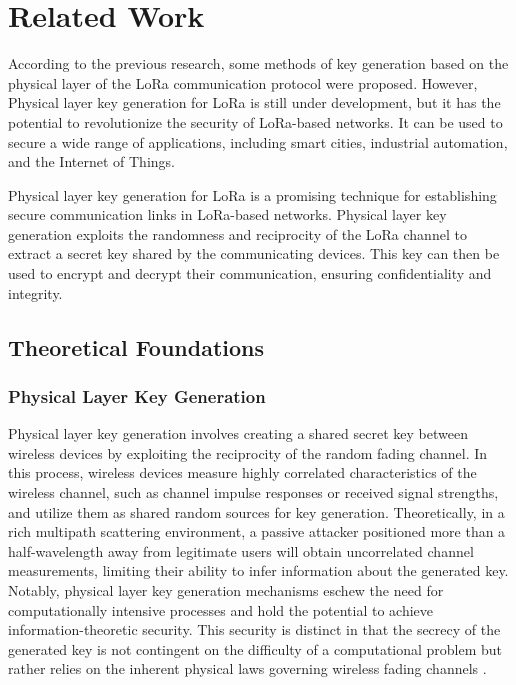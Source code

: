 
\chapter{Related Work}
According to the previous research, some methods of key generation based on the physical layer of the LoRa communication protocol were proposed. However, Physical layer key generation for LoRa is still under development, but it has the potential to revolutionize the security of LoRa-based networks. It can be used to secure a wide range of applications, including smart cities, industrial automation, and the Internet of Things.

Physical layer key generation for LoRa is a promising technique for establishing secure communication links in LoRa-based networks. Physical layer key generation exploits the randomness and reciprocity of the LoRa channel to extract a secret key shared by the communicating devices. This key can then be used to encrypt and decrypt their communication, ensuring confidentiality and integrity.

\section{Theoretical Foundations}

\subsection{Physical Layer Key Generation}
Physical layer key generation involves creating a shared secret key between wireless devices by exploiting the reciprocity of the random fading channel. In this process, wireless devices measure highly correlated characteristics of the wireless channel, such as channel impulse responses or received signal strengths, and utilize them as shared random sources for key generation. Theoretically, in a rich multipath scattering environment, a passive attacker positioned more than a half-wavelength away from legitimate users will obtain uncorrelated channel measurements, limiting their ability to infer information about the generated key. Notably, physical layer key generation mechanisms eschew the need for computationally intensive processes and hold the potential to achieve information-theoretic security. This security is distinct in that the secrecy of the generated key is not contingent on the difficulty of a computational problem but rather relies on the inherent physical laws governing wireless fading channels \cite{7120014}.

